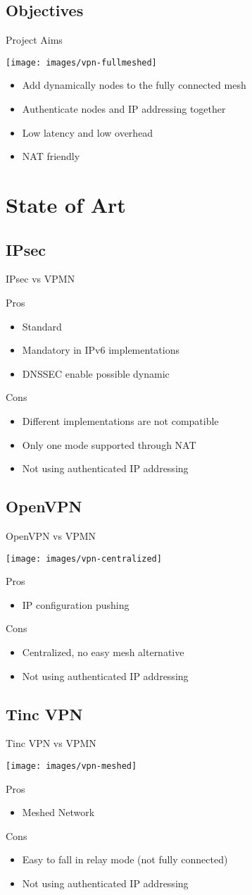 \documentclass{beamer}
\newcommand*{\comparativeframe}[5]{
\begin{frame}{#1}
	#2
	\begin{exampleblock}{Pros}
		\begin{itemize}
		#3
		\end{itemize}
	\end{exampleblock}
	\begin{alertblock}{Cons}
		\begin{itemize}
		#4
		\end{itemize}
	\end{alertblock}
	#5
\end{frame}
}
\begin{document}
\subsection*{Objectives}
\begin{frame}{Project Aims}
	\begin{center}
	\texttt{[image: images/vpn-fullmeshed]}
	\end{center}
	\begin{itemize}
	\item Add dynamically nodes to the fully connected mesh
	\item Authenticate nodes and IP addressing together
	\item Low latency and low overhead
	\item NAT friendly
	\end{itemize}
\end{frame}

\section{State of Art}
\subsection{IPsec}
\comparativeframe{IPsec vs VPMN}{}
{%
\item Standard
\item Mandatory in IPv6 implementations
\item DNSSEC enable possible dynamic
}{%
\item Different implementations are \alert{not compatible}
\item Only one mode supported through NAT
\item Not using authenticated IP addressing
}{}
\subsection{OpenVPN}
\comparativeframe{OpenVPN vs VPMN}
{\begin{center}
\texttt{[image: images/vpn-centralized]}
\end{center}}
{%
\item IP configuration pushing
}{%
\item Centralized, no easy mesh alternative
\item Not using authenticated IP addressing
}{}
\subsection{Tinc VPN}
\comparativeframe{Tinc VPN vs VPMN}
{\begin{center}
\texttt{[image: images/vpn-meshed]}
\end{center}}
{%
\item Meshed Network
}{%
\item Easy to fall in relay mode (not fully connected)
\item Not using authenticated IP addressing
}{}
\end{document}
